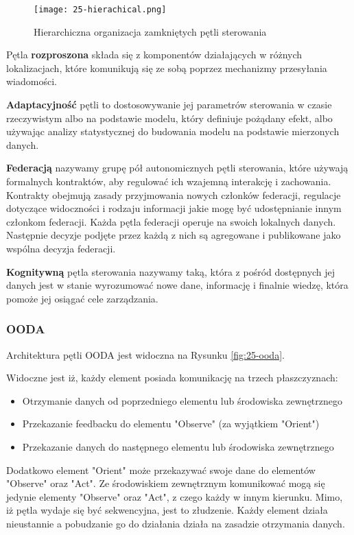 \begin{figure}[!h]
    \centering \texttt{[image: 25-hierachical.png]}
    \caption{Hierarchiczna organizacja zamkniętych pętli sterowania}\label{fig:25-hierachical}
\end{figure}

Pętla \textbf{rozproszona} składa się z komponentów działających w różnych lokalizacjach, które komunikują się ze sobą poprzez mechanizmy przesyłania wiadomości. 

\textbf{Adaptacyjność} pętli to dostosowywanie jej parametrów sterowania w czasie rzeczywistym albo na podstawie modelu, który definiuje pożądany efekt, albo używając analizy statystycznej do budowania modelu na podstawie mierzonych danych.

\textbf{Federacją} nazywamy grupę pół autonomicznych pętli sterowania, które używają formalnych kontraktów, aby regulować ich wzajemną interakcję i zachowania. Kontrakty obejmują zasady przyjmowania nowych członków federacji, regulacje dotyczące widoczności i rodzaju informacji jakie mogę być udostępnianie innym członkom federacji. Każda pętla federacji operuje na swoich lokalnych danych. Następnie decyzje podjęte przez każdą z nich są agregowane i publikowane jako wspólna decyzja federacji.

\textbf{Kognitywną} pętla sterowania nazywamy taką, która z pośród dostępnych jej danych jest w stanie wyrozumować nowe dane, informację i finalnie wiedzę, która pomoże jej osiągać cele zarządzania.

\subsubsection{OODA}
Architektura pętli OODA \cite{boyd1995} jest widoczna na Rysunku \ref{fig:25-ooda}.

Widoczne jest iż, każdy element posiada komunikację na trzech płaszczyznach:
\begin{itemize}
    \item Otrzymanie danych od poprzedniego elementu lub środowiska zewnętrznego
    \item Przekazanie feedbacku do elementu "Observe" (za wyjątkiem "Orient")
    \item Przekazanie danych do następnego elementu lub środowiska zewnętrznego
\end{itemize}

Dodatkowo element "Orient" może przekazywać swoje dane do elementów "Observe" oraz "Act". Ze środowiskiem zewnętrznym komunikować mogą się jedynie elementy "Observe" oraz "Act", z czego każdy w innym kierunku. Mimo, iż pętla wydaje się być sekwencyjna, jest to złudzenie. Każdy element działa nieustannie a pobudzanie go do działania działa na zasadzie otrzymania danych.

